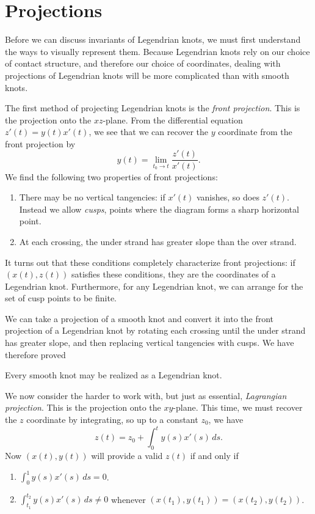 \documentclass{article}
\begin{document}
\section{Projections}
Before we can discuss invariants of Legendrian knots, we must first understand
the ways to visually represent them.
Because Legendrian knots rely on our choice of contact structure, and therefore
our choice of coordinates, dealing with projections of Legendrian knots will
be more complicated than with smooth knots.

The first method of projecting Legendrian knots is the {\it front projection}.
This is the projection onto the $xz$-plane. From the differential equation
$z'(t) = y(t)x'(t)$, we see that we can recover the $y$ coordinate from the front
projection by
\[y(t) = \lim_{t_0\to t}\frac{z'(t)}{x'(t)}.\]
We find the following two properties of front projections:
\begin{enumerate}[label=\roman*)]
\item There may be no vertical tangencies: if $x'(t)$ vanishes, so does $z'(t)$. Instead we 
allow {\it cusps}, points where the diagram forms a sharp horizontal point.
\item At each crossing, the under strand has greater slope than the over strand.
\end{enumerate}
It turns out that these conditions completely characterize front projections:
if $(x(t),z(t))$ satisfies these conditions, they are the coordinates of a Legendrian knot.
Furthermore, for any Legendrian knot, we can arrange for the set of cusp points to be finite.

We can take a projection of a smooth knot and convert it into the front
projection of a Legendrian knot by rotating each crossing until the under
strand has greater slope, and then
replacing vertical tangencies with cusps. We have therefore proved
\begin{theorem}
Every smooth knot may be realized as a Legendrian knot.
\end{theorem}

We now consider the harder to work with, but just as essential, {\it Lagrangian projection}.
This is the projection onto the $xy$-plane. This time, we must recover the $z$ coordinate
by integrating, so up to a constant $z_0$, we have
\[ z(t) = z_0 + \int_0^t y(s)x'(s)\,ds.\]
Now $(x(t),y(t))$ will provide a valid $z(t)$ if and only if
\begin{enumerate}[label=\roman*)]
\item $\int_0^1 y(s)x'(s)\,ds = 0$.
\item $\int_{t_1}^{t_2} y(s)x'(s)\,ds \neq 0$ whenever $(x(t_1),y(t_1))=(x(t_2),y(t_2))$.
\end{enumerate}
\end{document}
